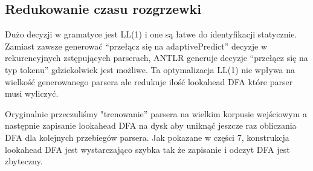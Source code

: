 \subsection{Redukowanie czasu rozgrzewki}
Dużo decyzji w gramatyce jest LL(1) i one są łatwe do identyfikacji
statycznie. Zamiast zawsze generować “przełącz się na
adaptivePredict” decyzje w rekurencyjnych zstępujących parserach,
ANTLR generuje decyzje “przełącz się na typ tokenu” gdziekolwiek
jest możliwe. Ta optymalizacja LL(1) nie wpływa na wielkość
generowanego parsera ale redukuje ilość lookahead DFA
które parser musi wyliczyć.
\par
Oryginalnie przeczuliśmy "trenowanie” parsera na wielkim
korpusie wejściowym a następnie zapisanie lookahead DFA na dysk
aby uniknąć jeszcze raz obliczania DFA dla kolejnych przebiegów parsera.
Jak pokazane w części 7, konstrukcja lookahead DFA jest wystarczająco szybka
tak że zapisanie i odczyt DFA jest zbyteczny.
